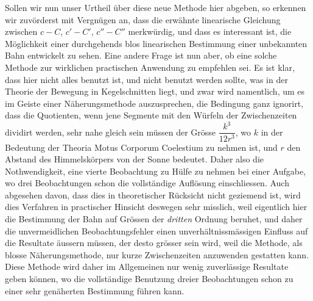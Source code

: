 Sollen wir nun unser Urtheil über diese neue Methode hier abgeben, so erkennen wir zuvörderst
mit Vergnügen an, dass die erwähnte linearische Gleichung zwischen $c-C$, $c'-C'$, $c''-C''$ merkwürdig, und dass es interessant ist, die Möglichkeit einer durchgehends blos linearischen Bestimmung einer unbekannten Bahn entwickelt zu sehen. Eine andere Frage ist nun aber, ob eine solche Methode
zur wirklichen practischen Anwendung zu empfehlen sei. Es ist klar, dass hier nicht alles benutzt ist,
und nicht benutzt werden sollte, was in der Theorie der Bewegung in Kegelschnitten liegt, und zwar
wird namentlich, um es im Geiste einer Näherungsmethode auszusprechen, die Bedingung ganz ignorirt, dass die Quotienten, wenn jene Segmente mit den Würfeln der Zwischenzeiten dividirt werden,
sehr nahe gleich sein müssen der Grösse $\dfrac{k^3}{12r^3}$, wo $k$ in der Bedeutung der Theoria Motus Corporum
Coelestium zu nehmen ist, und $r$ den Abstand des Himmelskörpers von der Sonne bedeutet. Daher
also die Nothwendigkeit, eine vierte Beobachtung zu Hülfe zu nehmen bei einer Aufgabe, wo drei
Beobachtungen schon die vollständige Auflösung einschliessen. Auch abgesehen davon, dass dies in
theoretischer Rücksicht nicht geziemend ist, wird dies Verfahren in practischer Hinsicht deswegen sehr
misslich, weil eigentlich hier die Bestimmung der Bahn auf Grössen der \emph{dritten} Ordnung beruhet, und
daher die unvermeidlichen Beobachtungsfehler einen unverhältnissmässigen Einfluss auf die Resultate
äussern müssen, der desto grösser sein wird, weil die Methode, als blosse Näherungsmethode, nur kurze Zwischenzeiten anzuwenden gestatten kann. Diese Methode wird daher im Allgemeinen nur wenig zuverlässige Resultate geben können, wo die vollständige Benutzung dreier Beobachtungen schon zu einer sehr genäherten Bestimmung führen kann.

